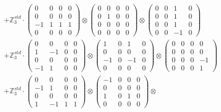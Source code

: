 \documentclass{article}
\begin{document}
{\begin{align}
        &+ \label{Rs1-Rc16-Solution-3-c12} \mathbb{Z}_3^{std} \cdot 
            \begin{pmatrix} 0 & 0 & 0 & 0 \\ 0 & 0 & 0 & 0 \\ -1 & 1 & 1 & 1 \\ 0 & 0 & 0 & 0 \end{pmatrix} \otimes 
            \begin{pmatrix} 0 & 0 & 0 & 0 \\ 0 & 1 & 0 & 0 \\ 0 & 0 & 0 & 0 \\ 0 & 0 & 0 & 0 \end{pmatrix} \otimes 
            \begin{pmatrix} 0 & 0 & 1 & 0 \\ 0 & 0 & 1 & 0 \\ 0 & 0 & 1 & 0 \\ 0 & 0 & -1 & 0 \end{pmatrix} \\ 
        &+ \label{Rs1-Rc16-Solution-3-c13} \mathbb{Z}_3^{std} \cdot 
            \begin{pmatrix} 0 & 0 & 0 & 0 \\ 1 & -1 & 0 & 0 \\ 0 & 0 & 0 & 0 \\ -1 & 1 & 0 & 0 \end{pmatrix} \otimes 
            \begin{pmatrix} 1 & 0 & 1 & 0 \\ 0 & 0 & 0 & 0 \\ -1 & 0 & -1 & 0 \\ 0 & 0 & 0 & 0 \end{pmatrix} \otimes 
            \begin{pmatrix} 0 & 0 & 0 & 0 \\ 0 & 0 & 0 & 0 \\ 0 & 0 & 0 & -1 \\ 0 & 0 & 0 & 1 \end{pmatrix} \\ 
        &+ \label{Rs1-Rc16-Solution-3-c14} \mathbb{Z}_3^{std} \cdot 
            \begin{pmatrix} 0 & 0 & 0 & 0 \\ -1 & 1 & 0 & 0 \\ 0 & 0 & 0 & 0 \\ 1 & -1 & 1 & 1 \end{pmatrix} \otimes 
            \begin{pmatrix} -1 & 0 & 0 & 0 \\ 0 & 0 & 0 & 0 \\ 1 & 0 & 1 & 0 \\ 0 & 0 & 0 & 0 \end{pmatrix} \otimes 

\end{align}}
\end{document}
